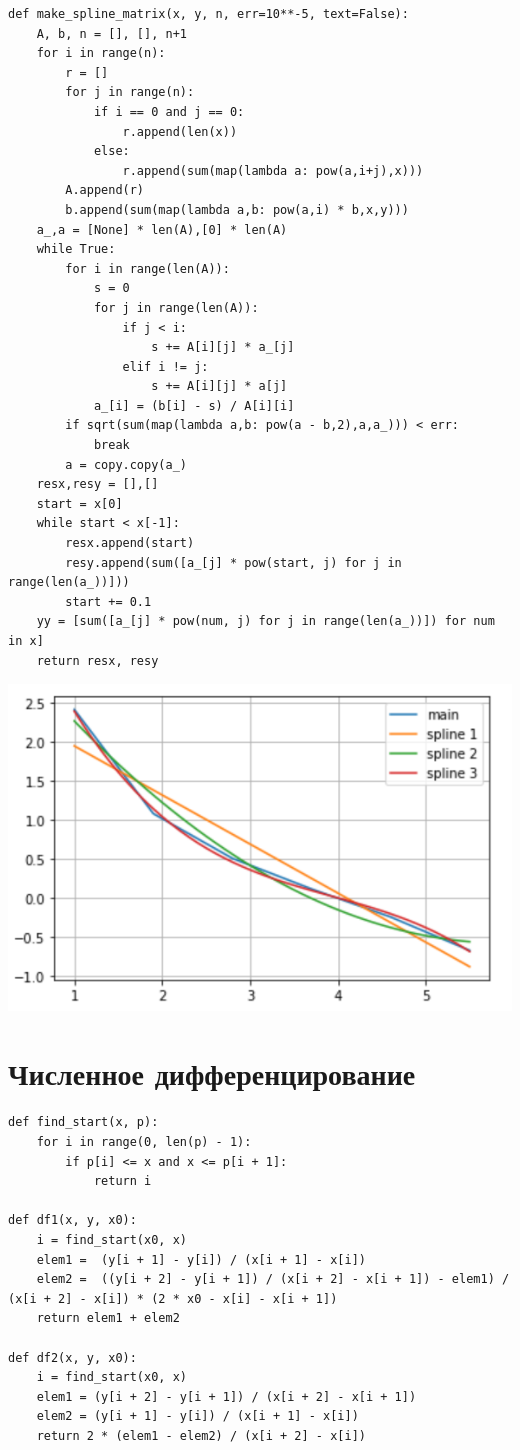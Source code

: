\documentclass[pdf, unicode, 12pt, a4paper,oneside,fleqn]{article}
\begin{document}
\begin{lstlisting}
def make_spline_matrix(x, y, n, err=10**-5, text=False):
    A, b, n = [], [], n+1
    for i in range(n):
        r = []
        for j in range(n):
            if i == 0 and j == 0:
                r.append(len(x))
            else:
                r.append(sum(map(lambda a: pow(a,i+j),x)))
        A.append(r)
        b.append(sum(map(lambda a,b: pow(a,i) * b,x,y)))
    a_,a = [None] * len(A),[0] * len(A)
    while True:
        for i in range(len(A)):
            s = 0
            for j in range(len(A)):
                if j < i:
                    s += A[i][j] * a_[j]
                elif i != j:
                    s += A[i][j] * a[j]
            a_[i] = (b[i] - s) / A[i][i]
        if sqrt(sum(map(lambda a,b: pow(a - b,2),a,a_))) < err:
            break
        a = copy.copy(a_)
    resx,resy = [],[]
    start = x[0]
    while start < x[-1]:
        resx.append(start)
        resy.append(sum([a_[j] * pow(start, j) for j in range(len(a_))]))
        start += 0.1
    yy = [sum([a_[j] * pow(num, j) for j in range(len(a_))]) for num in x]
    return resx, resy
\end{lstlisting}

\includegraphics[scale=0.5]{data3.png}

\section{Численное дифференцирование}

\begin{lstlisting}
def find_start(x, p):
    for i in range(0, len(p) - 1):
        if p[i] <= x and x <= p[i + 1]:
            return i

def df1(x, y, x0):
    i = find_start(x0, x)
    elem1 =  (y[i + 1] - y[i]) / (x[i + 1] - x[i])
    elem2 =  ((y[i + 2] - y[i + 1]) / (x[i + 2] - x[i + 1]) - elem1) / (x[i + 2] - x[i]) * (2 * x0 - x[i] - x[i + 1])
    return elem1 + elem2

def df2(x, y, x0):
    i = find_start(x0, x)
    elem1 = (y[i + 2] - y[i + 1]) / (x[i + 2] - x[i + 1])
    elem2 = (y[i + 1] - y[i]) / (x[i + 1] - x[i])
    return 2 * (elem1 - elem2) / (x[i + 2] - x[i])
\end{lstlisting}
\end{document}
